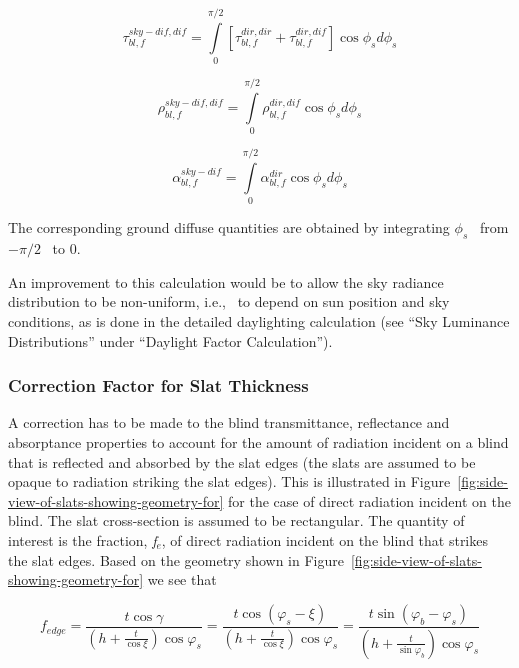 \begin{equation}
\tau_{bl,f}^{sky - dif,dif} = \int\limits_0^{\pi /2} {\left[ {\tau_{bl,f}^{dir,dir} + \tau_{bl,f}^{dir,dif}} \right]\cos {\phi_s}d{\phi_s}}
\end{equation}

\begin{equation}
\rho_{bl,f}^{sky - dif,dif} = \int\limits_0^{\pi /2} {\rho_{bl,f}^{dir,dif}\cos {\phi_s}d{\phi_s}}
\end{equation}

\begin{equation}
\alpha_{bl,f}^{sky - dif} = \int\limits_0^{\pi /2} {\alpha_{bl,f}^{dir}\cos {\phi_s}d{\phi_s}}
\end{equation}

The corresponding ground diffuse quantities are obtained by integrating \({\phi_s}\) ~from \(- \pi /2\) ~to 0.

An improvement to this calculation would be to allow the sky radiance distribution to be non-uniform, i.e.,~ to depend on sun position and sky conditions, as is done in the detailed daylighting calculation (see ``Sky Luminance Distributions'' under ``Daylight Factor Calculation'').

\subsubsection{Correction Factor for Slat Thickness}\label{correction-factor-for-slat-thickness}

A correction has to be made to the blind transmittance, reflectance and absorptance properties to account for the amount of radiation incident on a blind that is reflected and absorbed by the slat edges (the slats are assumed to be opaque to radiation striking the slat edges). This is illustrated in Figure~\ref{fig:side-view-of-slats-showing-geometry-for} for the case of direct radiation incident on the blind. The slat cross-section is assumed to be rectangular. The quantity of interest is the fraction, \emph{f\(_{e}\)}, of direct radiation incident on the blind that strikes the slat edges. Based on the geometry shown in Figure~\ref{fig:side-view-of-slats-showing-geometry-for} we see that

\begin{equation}
{f_{edge}} = \frac{{t\cos \gamma }}{{\left( {h + \frac{t}{{\cos \xi }}} \right)\cos {\varphi_s}}} = \frac{{t\cos ({\varphi_s} - \xi )}}{{\left( {h + \frac{t}{{\cos \xi }}} \right)\cos {\varphi_s}}} = \frac{{t\sin ({\varphi_b} - {\varphi_s})}}{{\left( {h + \frac{t}{{\sin {\varphi_b}}}} \right)\cos {\varphi_s}}}
\end{equation}

